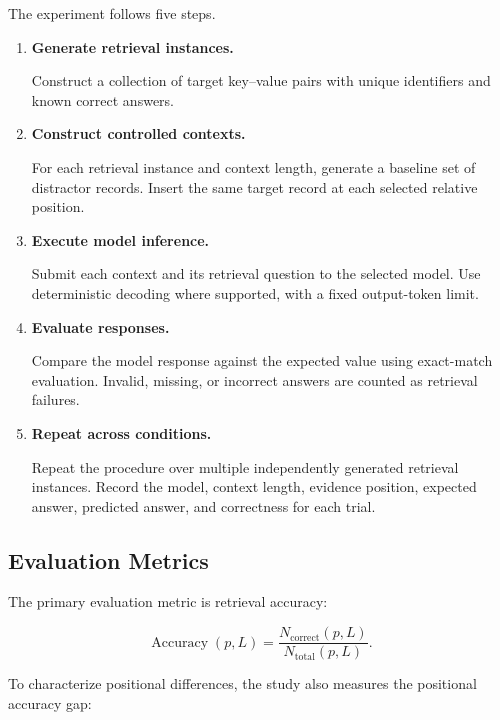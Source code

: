 The experiment follows five steps.

\begin{enumerate}
    \item \textbf{Generate retrieval instances.}

    Construct a collection of target key--value pairs
    with unique identifiers and known correct answers.

    \item \textbf{Construct controlled contexts.}

    For each retrieval instance and context length,
    generate a baseline set of distractor records.
    Insert the same target record at each selected
    relative position.

    \item \textbf{Execute model inference.}

    Submit each context and its retrieval question
    to the selected model. Use deterministic decoding
    where supported, with a fixed output-token limit.

    \item \textbf{Evaluate responses.}

    Compare the model response against the expected
    value using exact-match evaluation. Invalid,
    missing, or incorrect answers are counted
    as retrieval failures.

    \item \textbf{Repeat across conditions.}

    Repeat the procedure over multiple independently
    generated retrieval instances. Record the model,
    context length, evidence position, expected answer,
    predicted answer, and correctness for each trial.
\end{enumerate}

\subsection{Evaluation Metrics}
\label{subsec:evaluation}

The primary evaluation metric is retrieval accuracy:

\begin{equation}
    \operatorname{Accuracy}(p,L)
    =
    \frac{N_{\mathrm{correct}}(p,L)}
         {N_{\mathrm{total}}(p,L)}.
    \label{eq:accuracy}
\end{equation}

To characterize positional differences, the study
also measures the positional accuracy gap:

